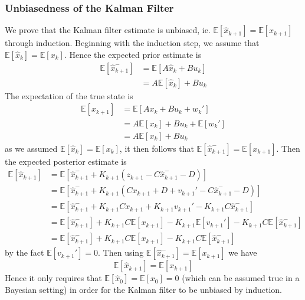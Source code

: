 \documentclass[11pt]{report} %
\begin{document}
\subsubsection{Unbiasedness of the Kalman Filter}

We prove that the Kalman filter estimate is unbiased, ie. $\mathbb{E}\left[\hat{x}_{k + 1}\right] = \mathbb{E}\left[x_{k + 1}\right]$ through induction. Beginning with the induction step, we assume that $\mathbb{E}\left[\hat{x}_{k}\right] = \mathbb{E}\left[x_{k}\right]$. Hence the expected prior estimate is
\begin{align}
\mathbb{E}\left[\hat{x}_{k + 1}^{-}\right] &= \mathbb{E}\left[A\hat{x}_{k} + Bu_{k}\right] \\
&= A\mathbb{E}\left[\hat{x}_{k}\right] + Bu_{k}
\end{align}
The expectation of the true state is
\begin{align}
\mathbb{E}\left[x_{k + 1}\right] &= \mathbb{E}\left[Ax_{k} + Bu_{k} + w_{k}'\right] \\
&= A\mathbb{E}\left[x_{k}\right] + Bu_{k} + \mathbb{E}\left[w_{k}'\right] \\
&= A\mathbb{E}\left[x_{k}\right] + Bu_{k}
\end{align}
as we assumed $\mathbb{E}\left[\hat{x}_{k}\right] = \mathbb{E}\left[x_{k}\right]$, it then follows that $\mathbb{E}\left[\hat{x}_{k + 1}^{-}\right] = \mathbb{E}\left[x_{k + 1}\right]$. Then the expected posterior estimate is
\begin{align}
\mathbb{E}\left[\hat{x}_{k + 1}\right] &= \mathbb{E}\left[\hat{x}_{k + 1}^{-} + K_{k + 1}\left(z_{k + 1} - C\hat{x}_{k + 1}^{-} - D\right)\right] \\
&= \mathbb{E}\left[\hat{x}_{k + 1}^{-} + K_{k + 1}\left(Cx_{k + 1} + D + v_{k + 1}' - C\hat{x}_{k + 1}^{-} - D\right)\right] \\
&= \mathbb{E}\left[\hat{x}_{k + 1}^{-} + K_{k + 1}Cx_{k + 1} + K_{k + 1}v_{k + 1}' - K_{k + 1}C\hat{x}_{k + 1}^{-}\right] \\
&= \mathbb{E}\left[\hat{x}_{k + 1}^{-}\right] + K_{k + 1}C\mathbb{E}\left[x_{k + 1}\right] - K_{k + 1}\mathbb{E}\left[v_{k + 1}'\right] - K_{k + 1}C\mathbb{E}\left[\hat{x}_{k + 1}^{-}\right] \\
&= \mathbb{E}\left[\hat{x}_{k + 1}^{-}\right] + K_{k + 1}C\mathbb{E}\left[x_{k + 1}\right] -  K_{k + 1}C\mathbb{E}\left[\hat{x}_{k + 1}^{-}\right]
\end{align}
by the fact $\mathbb{E}\left[v_{k + 1}'\right] = 0$. Then using $\mathbb{E}\left[\hat{x}_{k + 1}^{-}\right] = \mathbb{E}\left[x_{k + 1}\right]$ we have
\begin{equation}
\mathbb{E}\left[\hat{x}_{k + 1}\right] = \mathbb{E}\left[x_{k + 1}\right]
\end{equation}
Hence it only requires that $\mathbb{E}\left[\hat{x}_{0}\right] = \mathbb{E}\left[x_{0}\right] = 0$ (which can be assumed true in a Bayesian setting) in order for the Kalman filter to be unbiased by induction.
\end{document}
